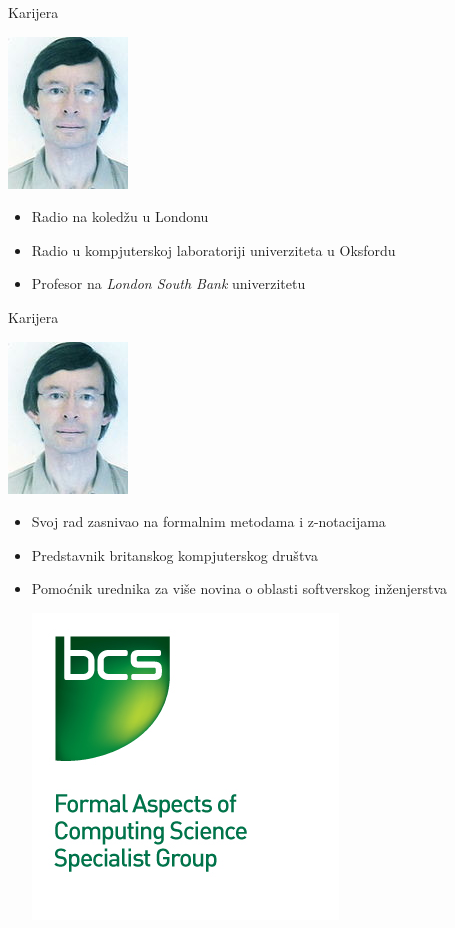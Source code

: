 \documentclass{beamer}
\begin{document}
\begin{frame}{Karijera}
    \begin{center} \includegraphics[scale=3]{Jonathan_Bowen_photograph.jpg} \end{center}
    \begin{itemize}
        \item Radio na koledžu u Londonu
        \item Radio u kompjuterskoj laboratoriji univerziteta u Oksfordu
        \item Profesor na \textit{London South Bank} univerzitetu
    \end{itemize}
\end{frame}

\begin{frame}{Karijera}
    \begin{center} \includegraphics[scale=3]{Jonathan_Bowen_photograph.jpg} \end{center}
    \begin{itemize}
        \item Svoj rad zasnivao na formalnim metodama i z-notacijama
        \item Predstavnik britanskog kompjuterskog društva
        \item Pomoćnik urednika za više novina o oblasti softverskog inženjerstva
	\begin{center} \includegraphics[scale=3]{BCS-FACS_logo.jpg} \end{center}
    \end{itemize}
\end{frame}
\end{document}
